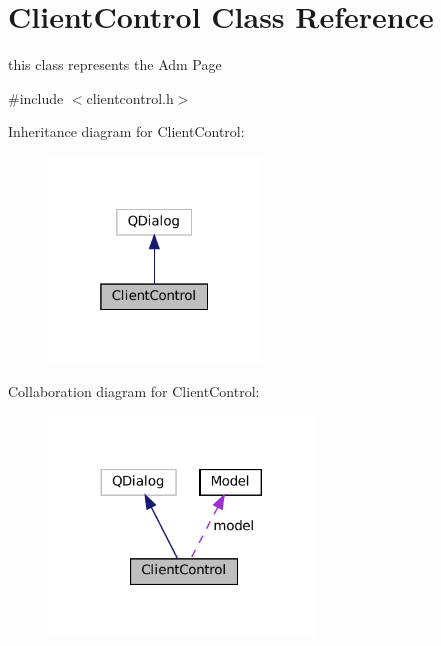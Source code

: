\hypertarget{classClientControl}{}\section{Client\+Control Class Reference}
\label{classClientControl}


this class represents the Adm Page  




{\ttfamily \#include $<$clientcontrol.\+h$>$}



Inheritance diagram for Client\+Control\+:
\nopagebreak
\begin{figure}[H]
\begin{center}
\leavevmode
\includegraphics[width=160pt]{classClientControl__inherit__graph}
\end{center}
\end{figure}


Collaboration diagram for Client\+Control\+:
\nopagebreak
\begin{figure}[H]
\begin{center}
\leavevmode
\includegraphics[width=200pt]{classClientControl__coll__graph}
\end{center}
\end{figure}

